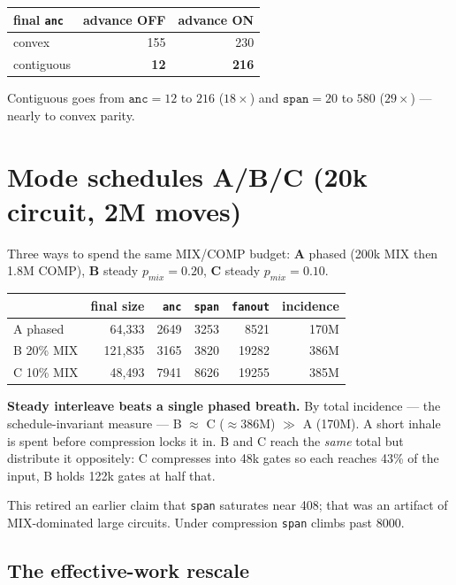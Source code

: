 \documentclass[11pt]{article}
\begin{document}
\begin{center}
\begin{tabular}{lrr}
\toprule
final \texttt{anc} & advance OFF & advance ON \\
\midrule
convex     & 155 & 230 \\
contiguous & \textbf{12} & \textbf{216} \\
\bottomrule
\end{tabular}
\end{center}

Contiguous goes from $\texttt{anc}=12$ to $216$ ($18\times$) and
$\texttt{span}=20$ to $580$ ($29\times$) --- nearly to convex parity.

\section{Mode schedules A/B/C (20k circuit, 2M moves)}

Three ways to spend the same MIX/COMP budget: \textbf{A} phased (200k MIX then
1.8M COMP), \textbf{B} steady $p_{mix}=0.20$, \textbf{C} steady $p_{mix}=0.10$.

\begin{center}
\begin{tabular}{lrrrrr}
\toprule
 & final size & \texttt{anc} & \texttt{span} & \texttt{fanout} & incidence \\
\midrule
A phased      &  64{,}333 & 2649 & 3253 &  8521 & 170M \\
B 20\% MIX    & 121{,}835 & 3165 & 3820 & 19282 & 386M \\
C 10\% MIX    &  48{,}493 & 7941 & 8626 & 19255 & 385M \\
\bottomrule
\end{tabular}
\end{center}

\textbf{Steady interleave beats a single phased breath.} By total incidence ---
the schedule-invariant measure --- B $\approx$ C ($\approx$386M) $\gg$ A (170M).
A short inhale is spent before compression locks it in. B and C reach the
\emph{same} total but distribute it oppositely: C compresses into 48k gates so
each reaches 43\% of the input, B holds 122k gates at half that.

This retired an earlier claim that \texttt{span} saturates near 408; that was an
artifact of MIX-dominated large circuits. Under compression \texttt{span} climbs
past 8000.

\subsection{The effective-work rescale}
\end{document}
